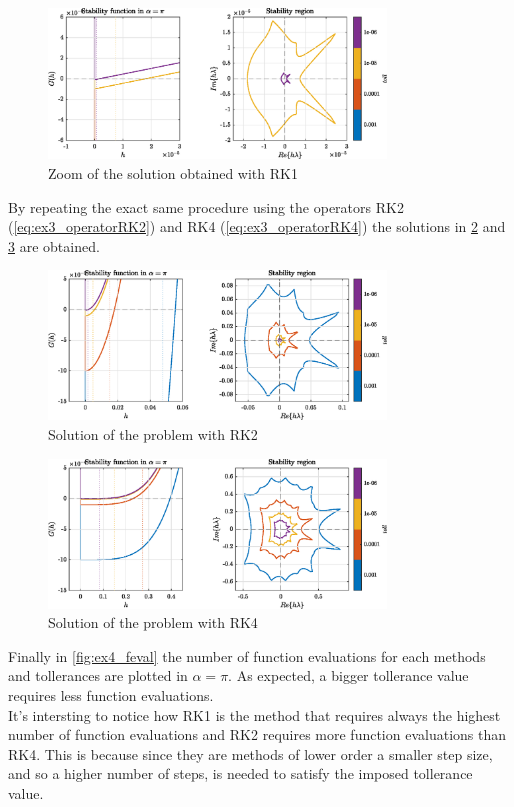 \documentclass[11pt,a4paper,oneside]{article}
\begin{document}
\begin{figure}[htb]
    \centering
    \includegraphics*[width=0.8\textwidth, keepaspectratio]{ex4_RK1zoom.eps}
    \caption[]{\label{fig:ex4_RK1zoom} Zoom of the solution obtained with RK1}
\end{figure}

By repeating the exact same procedure using the operators RK2 (\cref{eq:ex3_operatorRK2}) and RK4 (\cref{eq:ex3_operatorRK4}) the solutions in \cref{fig:ex4_RK2} and \cref{fig:ex4_RK4} are obtained.
\begin{figure}[htb]
    \centering
    \includegraphics*[width=0.8\textwidth, keepaspectratio]{ex4_RK2.eps}
    \caption[]{\label{fig:ex4_RK2} Solution of the problem with RK2}
\end{figure}
\begin{figure}[htb]
    \centering
    \includegraphics*[width=0.8\textwidth, keepaspectratio]{ex4_RK4.eps}
    \caption[]{\label{fig:ex4_RK4} Solution of the problem with RK4}
\end{figure}

Finally in \cref{fig:ex4_feval} the number of function evaluations for each methods and tollerances are plotted in $\alpha = \pi$.
As expected, a bigger tollerance value requires less function evaluations.\\
It's intersting to notice how RK1 is the method that requires always the highest number of function evaluations and RK2 requires more function evaluations than RK4.
This is because since they are methods of lower order a smaller step size, and so a higher number of steps, is needed to satisfy the imposed tollerance value.
\end{document}
